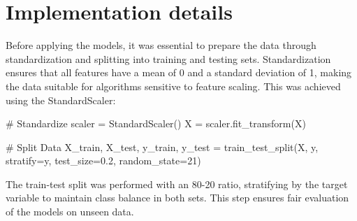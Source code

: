 \section{Implementation details}
Before applying the models, it was essential to prepare the data through standardization and splitting into training and testing sets. Standardization ensures that all features have a mean of 0 and a standard deviation of 1, making the data suitable for algorithms sensitive to feature scaling. This was achieved using the StandardScaler\cite{StandardScaler}:
\begin{python}
# Standardize
scaler = StandardScaler()
X = scaler.fit_transform(X)

# Split Data
X_train, X_test, y_train, y_test = 
        train_test_split(X, y, stratify=y, 
                    test_size=0.2, random_state=21)
\end{python}
The train-test split was performed with an 80-20 ratio, stratifying by the target variable to maintain class balance in both sets. This step ensures fair evaluation of the models on unseen data.

